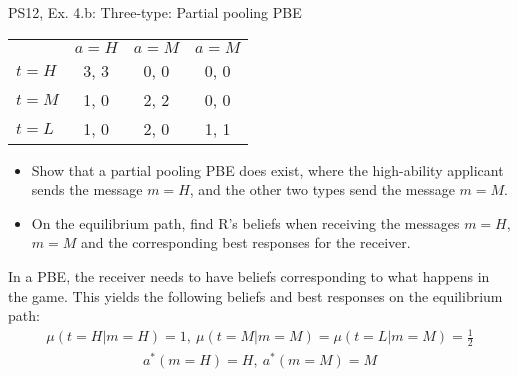 \begin{frame}{PS12, Ex. 4.b: Three-type: Partial pooling PBE}
    \begin{table}
      \begin{tabular}{l|c|c|c|}
          \multicolumn{1}{c}{} & \multicolumn{1}{c}{$a=H$} & \multicolumn{1}{c}{$a=M$} & \multicolumn{1}{c}{$a=M$} \\\cline{2-4}
          $t=H$ & 3, 3 & 0, 0 & 0, 0 \\\cline{2-4}
          $t=M$ & 1, 0 & 2, 2 & 0, 0 \\\cline{2-4}
          $t=L$ & 1, 0 & 2, 0 & 1, 1 \\\cline{2-4}
      \end{tabular}
    \end{table}\vspace{-8pt}
    \begin{itemize}
      \item[(b)] Show that a partial pooling PBE does exist, where the high-ability applicant sends the message $m = H$, and the other two types send the message $m = M$.
      \item[Step 1:] On the equilibrium path, find R's beliefs when receiving the messages $m=H$, $m=M$ and the corresponding best responses for the receiver.
    \end{itemize}\vspace{-6pt}
    In a PBE, the receiver needs to have beliefs corresponding to what happens in the game. This yields the following beliefs and best responses on the equilibrium path:\vspace{-2pt}
    \begin{align*}
        \mu(t=H|m=H)=1,\
        \mu(t=M|m=M)=\mu(t=L|m=M)=\frac{1}{2}
    \end{align*}\vspace{-18pt}
    \begin{align*}
        a^*(m=H)=H,\ a^*(m=M)=M
    \end{align*}
    \vfill\null
\end{frame}
